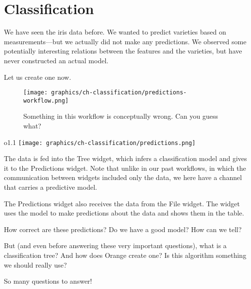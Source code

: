 \chapter{Classification}
\label{ch:classification}

We have seen the iris data before.  We wanted to predict varieties based on measurements---but we actually did not make any predictions. We observed some potentially interesting relations between the features and the varieties, but have never constructed an actual model.

Let us create one now.

\begin{figure}[h]
    \centering
    \vspace{-0.2cm}
    \texttt{[image: graphics/ch-classification/predictions-workflow.png]}
    \caption{Something in this workflow is conceptually wrong. Can you guess what?}
    \label{fig:spectral_preprocessing-fig2}
\end{figure}

\begin{wrapfigure}{o}{1.1\textwidth}
    \texttt{[image: graphics/ch-classification/predictions.png]}
    \label{fig:classification-predictions}
\end{wrapfigure}

The data is fed into the Tree widget, which infers a classification model and gives it to the Predictions widget. Note that unlike in our past workflows, in which the communication between widgets included only the data, we here have a channel that carries a predictive model.

The Predictions widget also receives the data from the File widget. The widget uses the model to make predictions about the data and shows them in the table.

How correct are these predictions? Do we have a good model? How can we tell?

But (and even before answering these very important questions), what is a classification tree? And how does Orange create one? Is this algorithm something we should really use?

So many questions to answer!
